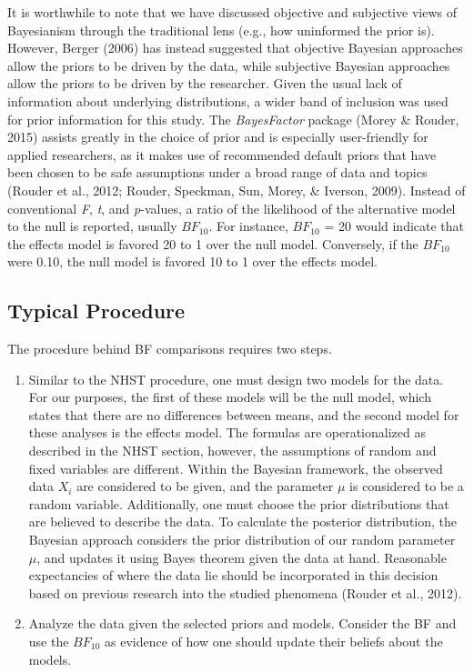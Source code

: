 \documentclass[,man, mask]{apa6}
\theoremstyle{definition}
\theoremstyle{definition}
\theoremstyle{definition}
\theoremstyle{remark}
\begin{document}
It is worthwhile to note that we have discussed objective and subjective
views of Bayesianism through the traditional lens (e.g., how uninformed
the prior is). However, Berger (2006) has instead suggested that
objective Bayesian approaches allow the priors to be driven by the data,
while subjective Bayesian approaches allow the priors to be driven by
the researcher. Given the usual lack of information about underlying
distributions, a wider band of inclusion was used for prior information
for this study. The \emph{BayesFactor} package (Morey \& Rouder, 2015)
assists greatly in the choice of prior and is especially user-friendly
for applied researchers, as it makes use of recommended default priors
that have been chosen to be safe assumptions under a broad range of data
and topics (Rouder et al., 2012; Rouder, Speckman, Sun, Morey, \&
Iverson, 2009). Instead of conventional \emph{F}, \emph{t}, and
\emph{p}-values, a ratio of the likelihood of the alternative model to
the null is reported, usually \(BF_{10}\). For instance, \(BF_{10}\) =
20 would indicate that the effects model is favored 20 to 1 over the
null model. Conversely, if the \(BF_{10}\) were 0.10, the null model is
favored 10 to 1 over the effects model.

\subsection{Typical Procedure}\label{typical-procedure-1}

The procedure behind BF comparisons requires two steps.

\begin{enumerate}
\def\labelenumi{\arabic{enumi})}
\item
  Similar to the NHST procedure, one must design two models for the
  data. For our purposes, the first of these models will be the null
  model, which states that there are no differences between means, and
  the second model for these analyses is the effects model. The formulas
  are operationalized as described in the NHST section, however, the
  assumptions of random and fixed variables are different. Within the
  Bayesian framework, the observed data \(X_{i}\) are considered to be
  given, and the parameter \(\mu\) is considered to be a random
  variable. Additionally, one must choose the prior distributions that
  are believed to describe the data. To calculate the posterior
  distribution, the Bayesian approach considers the prior distribution
  of our random parameter \(\mu\), and updates it using Bayes theorem
  given the data at hand. Reasonable expectancies of where the data lie
  should be incorporated in this decision based on previous research
  into the studied phenomena (Rouder et al., 2012).
\item
  Analyze the data given the selected priors and models. Consider the BF
  and use the \(BF_{10}\) as evidence of how one should update their
  beliefs about the models.
\end{enumerate}
\end{document}
